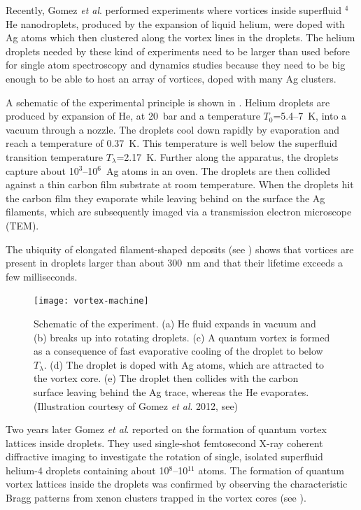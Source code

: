 	Recently, Gomez \emph{et al}. performed experiments\citep{Gomez:2012} where vortices inside superfluid $^4$He nanodroplets, produced by the expansion of liquid helium, were doped with Ag atoms which then clustered along the vortex lines in the droplets. The helium droplets needed by these kind of experiments need to be larger than used before for single atom spectroscopy and dynamics studies because they need to be big enough to be able to host an array of vortices, doped with many Ag clusters.
	
	A schematic of the experimental principle is shown in . Helium droplets are produced by expansion of He, at 20~bar and a temperature $T_0$=5.4--7~K, into a vacuum through a nozzle. The droplets cool down rapidly by evaporation and reach a temperature of 0.37~K\citep{Hartmann1995}. This temperature is well below the superfluid transition temperature $T_\lambda$=2.17~K\citep{Don91,Pit03}. Further along the apparatus, the droplets capture about 10$^3$–10$^6$~Ag atoms in an oven\citep{Log11d}. The droplets are then collided against a thin carbon film substrate at room temperature\citep{Log11d}. When the droplets hit the carbon film they evaporate while leaving behind on the surface the Ag filaments, which are subsequently imaged via a transmission electron microscope (TEM).
	
	The ubiquity of elongated filament-shaped deposits (see ) shows that vortices are present in droplets larger than about 300~nm and that their lifetime exceeds a few milliseconds.
	
	\begin{figure}[t]
		\begin{center}
			\texttt{[image: vortex-machine]}
			\caption{Schematic of the experiment. (a) He fluid expands in vacuum and (b) breaks up into rotating droplets. (c) A quantum vortex is formed as a consequence of fast evaporative cooling of the droplet to below $T_\lambda$. (d) The droplet is doped with Ag atoms, which are attracted to the vortex core. (e) The droplet then collides with the carbon surface leaving behind the Ag trace, whereas the He evaporates. (Illustration courtesy of Gomez \emph{et al}. 2012, see)}
			\label{fig:vortex-machine}
		\end{center}
	\end{figure}	
	
	Two years later Gomez \emph{et al}. reported\citep{Gom14} on the formation of quantum vortex lattices inside droplets. They used single-shot femtosecond X-ray coherent diffractive imaging to investigate the rotation of single, isolated superfluid helium-4 droplets containing about 10$^8$--10$^{11}$ atoms. The formation of quantum vortex lattices inside the droplets was confirmed by observing the characteristic Bragg patterns from xenon clusters trapped in the vortex cores (see ).

